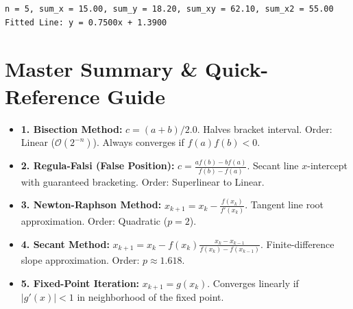 \documentclass[10pt,a4paper]{report}
\begin{document}
\begin{tcolorbox}[colback=termbg,colframe=primary,title=\textbf{Program Execution Output \& Convergence Table},boxrule=1pt,arc=2mm]
\begin{lstlisting}[style=terminal_output]
n = 5, sum_x = 15.00, sum_y = 18.20, sum_xy = 62.10, sum_x2 = 55.00
Fitted Line: y = 0.7500x + 1.3900
\end{lstlisting}
\end{tcolorbox}

\newpage

\chapter{Master Summary \& Quick-Reference Guide}

\begin{tcolorbox}[colback=codebg,colframe=secondary,title=\textbf{Unit 1: Roots of Non-Linear Equations},boxrule=1.2pt,arc=2mm]
\begin{itemize}[leftmargin=*,itemsep=4pt]
\item \textbf{1. Bisection Method:} $c = (a+b)/2.0$. Halves bracket interval. Order: Linear ($\mathcal{O}(2^{-n})$). Always converges if $f(a)f(b) < 0$.
\item \textbf{2. Regula-Falsi (False Position):} $c = \frac{a f(b) - b f(a)}{f(b) - f(a)}$. Secant line $x$-intercept with guaranteed bracketing. Order: Superlinear to Linear.
\item \textbf{3. Newton-Raphson Method:} $x_{k+1} = x_k - \frac{f(x_k)}{f'(x_k)}$. Tangent line root approximation. Order: Quadratic ($p=2$).
\item \textbf{4. Secant Method:} $x_{k+1} = x_k - f(x_k)\frac{x_k - x_{k-1}}{f(x_k) - f(x_{k-1})}$. Finite-difference slope approximation. Order: $p \approx 1.618$.
\item \textbf{5. Fixed-Point Iteration:} $x_{k+1} = g(x_k)$. Converges linearly if $|g'(x)| < 1$ in neighborhood of the fixed point.
\end{itemize}
\end{tcolorbox}
\end{document}
